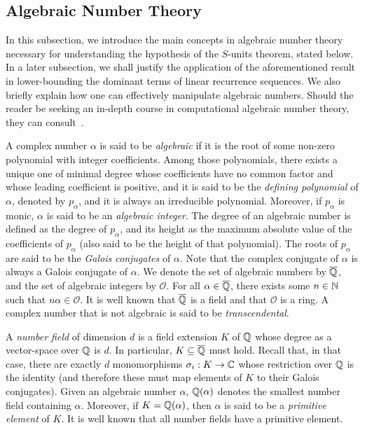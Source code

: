 \subsection{Algebraic Number Theory}
\label{sec:ant}

In this subsection, we introduce the main concepts in algebraic number theory necessary for understanding the hypothesis of the $S$-units theorem, stated below. In a later subsection, we shall justify the application of the aforementioned result in lower-bounding the dominant terms of linear recurrence sequences. We also briefly explain how one can effectively manipulate algebraic numbers. Should the reader be seeking an in-depth course in computational algebraic number theory, they can consult~\cite{Cohen}.

A complex number $\alpha$ is said to be \emph{algebraic} if it is the root of some non-zero polynomial with integer coefficients. Among those polynomials, there exists a unique one of minimal degree whose coefficients have no common factor and whose leading coefficient is positive, and it is said to be the \emph{defining polynomial} of $\alpha$, denoted by $p_{\alpha}$, and it is always an irreducible polynomial. Moreover, if $p_{\alpha}$ is monic, $\alpha$ is said to be an \emph{algebraic integer}. The degree of an algebraic number is defined as the degree of $p_{\alpha}$, and its height as the maximum absolute value of the coefficients of $p_{\alpha}$ (also said to be the height of that polynomial). The roots of $p_{\alpha}$ are said to be the \emph{Galois conjugates} of $\alpha$. Note that the complex conjugate of $\alpha$ is always a Galois conjugate of $\alpha$.
We denote the set of algebraic numbers by $\overline{\mathbb{Q}}$, and the set of algebraic integers by $\mathcal{O}$. For all $\alpha \in \overline{\mathbb{Q}}$, there exists some $n\in\mathbb{N}$ such that $n \alpha \in \mathcal{O}$. It is well known that $\overline{\mathbb{Q}}$ is a field and that $\mathcal{O}$ is a ring. A complex number that is not algebraic is said to be \emph{transcendental}.

A \emph{number field} of dimension $d$ is a field extension $K$ of $\mathbb{Q}$ whose degree as a vector-space over $\mathbb{Q}$ is $d$. In particular, $K\subseteq\overline{\mathbb{Q}}$ must hold.
Recall that, in that case, there are exactly $d$ monomorphisms $\sigma_{i} : K \rightarrow \mathbb{C}$ whose restriction over $\mathbb{Q}$ is the identity (and therefore these must map elements of $K$ to their Galois conjugates).
Given an algebraic number $\alpha$, $\mathbb{Q}(\alpha)$ denotes the smallest number field containing $\alpha$. Moreover, if $K=\mathbb{Q}(\alpha)$, then $\alpha$ is said to be a \emph{primitive element} of $K$. It is well known that all number fields have a primitive element.

